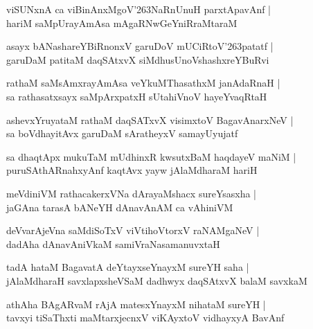 \documentclass[twoside,12pt,openright]{book}
\def\S{\char'263}
\newcounter{shloka}[chapter]
\begin{document}
\begin{shloka}%
viSUNxnA ca viBinAnxMgoV\S NaRnUnuH parxtApavAnf |\\
hariM saMpUrayAmAsa mAgaRNwGeYniRraMtaraM 
\end{shloka}

\begin{shloka}%
asayx bANashareYBiRnonxV garuDoV mUCiRtoV\S patatf |\\
garuDaM patitaM daqSAtxvX siMdhusUnoVshashxreYBuRvi
\end{shloka}

\begin{shloka}%
rathaM saMsAmxrayAmAsa veYkuMThasathxM janAdaRnaH |\\
sa rathasatxsayx saMpArxpatxH sUtahiVnoV hayeYvaqRtaH
\end{shloka}

\begin{shloka}%
ashevxYruyataM rathaM daqSATxvX visimxtoV BagavAnarxNeV |\\
sa boVdhayitAvx garuDaM sAratheyxV samayUyujatf
\end{shloka}

\begin{shloka}%
sa dhaqtApx mukuTaM mUdhinxR kwsutxBaM haqdayeV maNiM |\\
puruSAthARnahxyAnf kaqtAvx yayw jAlaMdharaM hariH 
\end{shloka}

\begin{shloka}%
meVdiniVM rathacakerxVNa dArayaMshacx sureYsasxha |\\
jaGAna tarasA bANeYH dAnavAnAM ca vAhiniVM 
\end{shloka}

\begin{shloka}%
deVvarAjeVna saMdiSoTxV viVtihoVtorxV raNAMgaNeV |\\
dadAha dAnavAniVkaM samiVraNasamanuvxtaH 
\end{shloka}

\begin{shloka}%
tadA hataM BagavatA deYtayxseYnayxM sureYH saha |\\
jAlaMdharaH savxlapxsheVSaM dadhwyx daqSAtxvX balaM savxkaM 
\end{shloka}

\begin{shloka}%
athAha BAgARvaM rAjA matesxYnayxM nihataM sureYH |\\
tavxyi tiSaThxti maMtarxjecnxV viKAyxtoV vidhayxyA BavAnf
\end{shloka}
\end{document}
